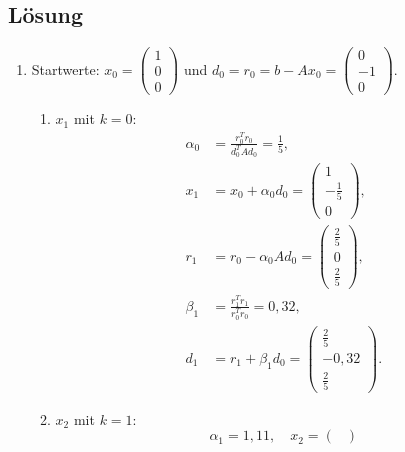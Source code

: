 \documentclass{exercise}
\begin{document}
    \subsection*{Lösung}
    \begin{enumerate}
        \item Startwerte: \(x_0 = \begin{pmatrix}
            1\\
            0\\
            0
        \end{pmatrix}\) und \(d_0 = r_0 = b - Ax_0 = \begin{pmatrix}
            0\\
            -1\\
            0
        \end{pmatrix}\).
        \begin{enumerate}
            \item \(x_1\) mit \(k = 0\):
            \begin{align*}
                \alpha_0 &= \frac{r_0^T r_0}{d_0^T Ad_0} = \frac{1}{5},\\
                x_1 &= x_0 + \alpha_0 d_0 = \begin{pmatrix}
                    1\\
                    -\frac{1}{5}\\
                    0
                \end{pmatrix},\\
                r_1 &= r_0 - \alpha_0 Ad_0 = \begin{pmatrix}
                    \frac{2}{5}\\
                    0\\
                    \frac{2}{5}
                \end{pmatrix},\\
                \beta_1 &= \frac{r_1^T r_1}{r_0^T r_0} = 0,32,\\
                d_1 &= r_1 + \beta_1 d_0 = \begin{pmatrix}
                    \frac{2}{5}\\
                    -0,32\\
                    \frac{2}{5}
                \end{pmatrix}.
            \end{align*}
            \item \(x_2\) mit \(k = 1\):
            \[
                \alpha_1 = 1,11, \quad x_2 = \begin{pmatrix}

\end{pmatrix}\]
\end{enumerate}
\end{enumerate}
\end{document}
